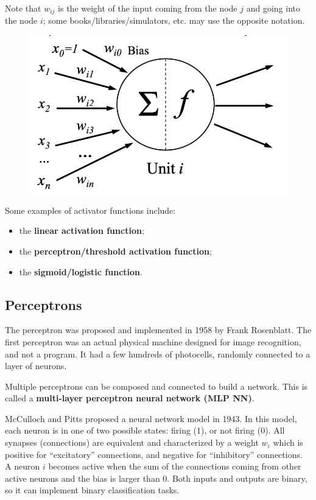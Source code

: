 Note that $w_{ij}$ is the weight of the input coming from the node $j$ and going into the node $i$; some books/libraries/simulators, etc. may use the opposite notation.

\begin{figure}[h]
    \centering
    \includegraphics[width=0.5\linewidth]{img/Neuron.png}
\end{figure}

Some examples of activator functions include:

\begin{itemize}
    \item the \textbf{linear activation function};
    \item the \textbf{perceptron/threshold activation function};
    \item the \textbf{sigmoid/logistic function}.
\end{itemize}

\subsection{Perceptrons}

The perceptron was proposed and implemented in 1958 by Frank Rosenblatt. The first perceptron was an actual physical machine designed for image recognition, and not a program. It had a few hundreds of photocells, randomly connected to a layer of neurons.

Multiple perceptrons can be composed and connected to build a network. This is called a \textbf{multi-layer perceptron neural network (MLP NN)}. 

McCulloch and Pitts proposed a neural network model in 1943. In this model, each neuron is in one of two possible states: firing (1), or not firing (0). All synapses (connections) are equivalent and characterized by a weight $w_i$ which is positive for ``excitatory'' connections, and negative for ``inhibitory'' connections. A neuron $i$ becomes active when the sum of the connections coming from other active neurons and the bias is larger than 0. Both inputs and outputs are binary, so it can implement binary classification tasks.

